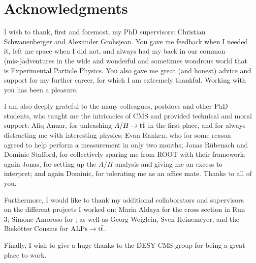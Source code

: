 \chapter{Acknowledgments}

I wish to thank, first and foremost, my PhD supervisors: Christian Schwanenberger and Alexander Grohsjean. You gave me feedback when I needed it, left me space when I did not, and always had my back in our common (mis-)adventures in the wide and wonderful and sometimes wondrous world that is Experimental Particle Physics. You also gave me great (and honest) advice and support for my further career, for which I am extremely thankful. Working with you has been a pleasure.

I am also deeply grateful to the many colleagues, postdocs and other PhD students, who taught me the intricacies of CMS and provided technical and moral support: Afiq Anuar, for unleashing $A/H \rightarrow \mathrm{t \bar{t}}$ in the first place, and for always distracting me with interesting physics; Evan Ranken, who for some reason agreed to help perform a measurement in only two months; Jonas R{\"u}benach and Dominic Stafford, for collectively sparing me from ROOT with their framework; again Jonas, for setting up the $A/H$ analysis and giving me an excess to interpret; and again Dominic, for tolerating me as an office mate. Thanks to all of you.

Furthermore, I would like to thank my additional collaborators and supervisors on the different projects I worked on: Maria Aldaya for the \ttbar cross section in Run 3; Simone Amoroso for \bbfourl; as well as Georg Weiglein, Sven Heinemeyer, and the Biek{\"o}tter Cousins for $\mathrm{ALPs} \rightarrow \mathrm{t \bar{t}}$. 

Finally, I wish to give a huge thanks to the DESY CMS group for being a great place to work.